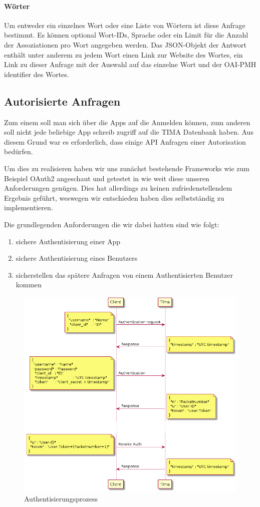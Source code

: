 \paragraph{Wörter} Um entweder ein einzelnes Wort oder eine Liste von Wörtern ist diese Anfrage bestimmt. Es können optional Wort-IDs, Sprache oder ein Limit für die Anzahl der Assoziationen pro Wort angegeben werden. Das JSON-Objekt der Antwort enthält unter anderem zu jedem Wort einen Link zur Website des Wortes, ein Link zu dieser Anfrage mit der Auswahl auf das einzelne Wort und der OAI-PMH identifier des Wortes.

\subsection{Autorisierte Anfragen}
Zum einem soll man sich über die Apps auf die Anmelden können, zum anderen soll nicht jede beliebige App schreib zugriff auf die TIMA Datenbank haben. Aus diesem Grund war es erforderlich, dass einige API Anfragen einer Autorisation bedürfen.

Um dies zu realisieren haben wir uns zunächst bestehende Frameworks wie zum Beispiel OAuth2 angeschaut und getestet in wie weit diese unseren Anforderungen genügen. Dies hat allerdings zu keinen zufriedenstellendem Ergebnis geführt, weswegen wir entschieden haben dies selbstständig zu implementieren.

Die grundlegenden Anforderungen die wir dabei hatten sind wie folgt:
\begin{enumerate}
	\item sichere Authentisierung einer App
	\item sichere Authentisierung eines Benutzers
	\item sicherstellen das spätere Anfragen von einem Authentisierten Benutzer kommen
\end{enumerate}

\begin{figure}[!h]
	\centering
	\includegraphics[width=\textwidth]{images/auth.png}
	\caption{Authentisierungsprozess}
	\label{fig:auth}
\end{figure}

